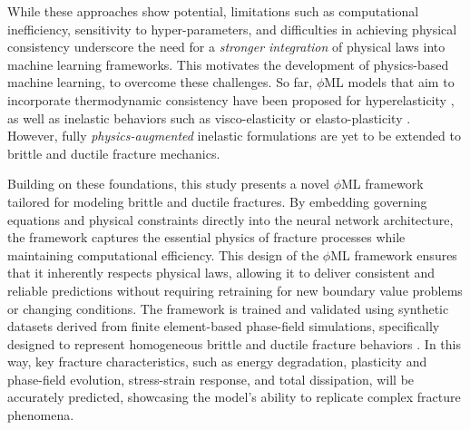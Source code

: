 \documentclass[final,3p,times]{elsarticle}
\begin{document}
While these approaches show potential, limitations such as computational inefficiency, sensitivity to hyper-parameters, and difficulties in achieving physical consistency underscore the need for a {\it stronger integration} of physical laws into machine learning frameworks. This motivates the development of physics-based machine learning, to overcome these challenges. So far, $\phi$ML models that aim to incorporate thermodynamic consistency have been proposed for hyperelasticity \cite{le2015,gonzalez2020,fernandez2021,klein2022}, as well as inelastic behaviors such as visco-elasticity \cite{tac2023a,rosenkranz2024a} or elasto-plasticity \cite{masi2021,vlassis2021,masi2023,fuhg2023,vlassis2023}. However, fully \emph{physics-augmented} inelastic formulations are yet to be extended to brittle and ductile fracture mechanics.

\medskip

Building on these foundations, this study presents a novel $\phi$ML framework tailored for modeling brittle and ductile fractures. By embedding governing equations and physical constraints directly into the neural network architecture, the framework captures the essential physics of fracture processes while maintaining computational efficiency. This design of the $\phi$ML framework ensures that it inherently respects physical laws, allowing it to deliver consistent and reliable predictions without requiring retraining for new boundary value problems or changing conditions. The framework is trained and validated using synthetic datasets derived from finite element-based phase-field simulations, specifically designed to represent homogeneous brittle and ductile fracture behaviors \cite{aldakheel2021simulation}. In this way, key fracture characteristics, such as energy degradation, plasticity and phase-field evolution, stress-strain response, and total dissipation, will be accurately predicted, showcasing the model's ability to replicate complex fracture phenomena. 
\end{document}
